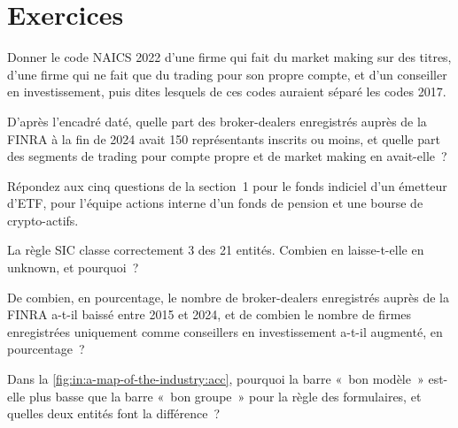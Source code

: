 \section{Exercices}

\begin{exercise}[$\star$]\label{exo:in:a-map-of-the-industry:1}
Donner le code NAICS 2022 d'une firme qui fait du market making sur des titres, d'une firme qui ne fait que du trading pour son propre compte, et
d'un conseiller en investissement, puis dites lesquels de ces codes auraient séparé les codes 2017.
\end{exercise}

\begin{exercise}[$\star$]\label{exo:in:a-map-of-the-industry:2}
D'après l'encadré daté, quelle part des broker-dealers enregistrés auprès de la FINRA à la fin de 2024 avait 150 représentants inscrits ou
moins, et quelle part des segments de trading pour compte propre et de market making en avait-elle~?
\end{exercise}

\begin{exercise}[$\star$]\label{exo:in:a-map-of-the-industry:3}
Répondez aux cinq questions de la section~1 pour le fonds indiciel d'un émetteur d'ETF, pour l'équipe actions interne d'un fonds de pension et une
bourse de crypto-actifs.
\end{exercise}

\begin{exercise}[$\star\star$]\label{exo:in:a-map-of-the-industry:4}
La règle SIC classe correctement 3 des 21 entités. Combien en laisse-t-elle en unknown, et pourquoi~?
\end{exercise}

\begin{exercise}[$\star\star$]\label{exo:in:a-map-of-the-industry:5}
De combien, en pourcentage, le nombre de broker-dealers enregistrés auprès de la FINRA a-t-il baissé entre 2015 et 2024, et
de combien le nombre de firmes enregistrées uniquement comme conseillers en investissement a-t-il augmenté, en pourcentage~?
\end{exercise}

\begin{exercise}[$\star\star$]\label{exo:in:a-map-of-the-industry:6}
Dans la \cref{fig:in:a-map-of-the-industry:acc}, pourquoi la barre «~bon modèle~» est-elle plus basse que la barre «~bon groupe~» pour la
règle des formulaires, et quelles deux entités font la différence~?
\end{exercise}

